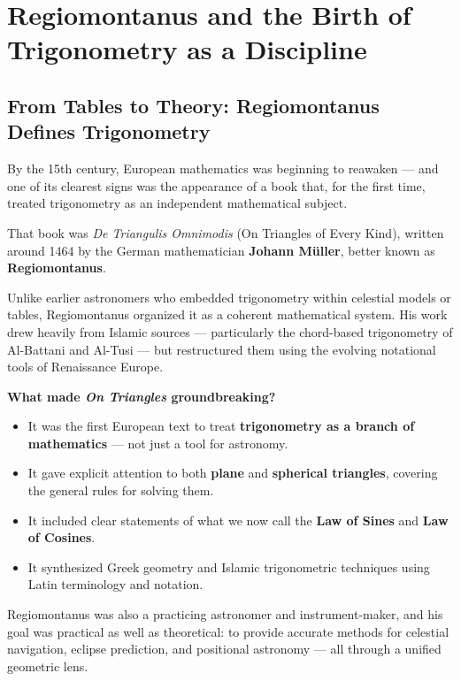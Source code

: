 \section{Regiomontanus and the Birth of Trigonometry as a Discipline}

\subsection{From Tables to Theory: Regiomontanus Defines Trigonometry}

By the 15th century, European mathematics was beginning to reawaken — and one of its clearest signs was the appearance of a book that, for the first time, treated trigonometry as an independent mathematical subject.

That book was \textit{De Triangulis Omnimodis} (On Triangles of Every Kind), written around 1464 by the German mathematician \textbf{Johann Müller}, better known as \textbf{Regiomontanus}.

Unlike earlier astronomers who embedded trigonometry within celestial models or tables, Regiomontanus organized it as a coherent mathematical system. His work drew heavily from Islamic sources — particularly the chord-based trigonometry of Al-Battani and Al-Tusi — but restructured them using the evolving notational tools of Renaissance Europe.

\textbf{What made \textit{On Triangles} groundbreaking?}

\begin{itemize}
  \item It was the first European text to treat \textbf{trigonometry as a branch of mathematics} — not just a tool for astronomy.
  \item It gave explicit attention to both \textbf{plane} and \textbf{spherical triangles}, covering the general rules for solving them.
  \item It included clear statements of what we now call the \textbf{Law of Sines} and \textbf{Law of Cosines}.
  \item It synthesized Greek geometry and Islamic trigonometric techniques using Latin terminology and notation.
\end{itemize}

Regiomontanus was also a practicing astronomer and instrument-maker, and his goal was practical as well as theoretical: to provide accurate methods for celestial navigation, eclipse prediction, and positional astronomy — all through a unified geometric lens.

